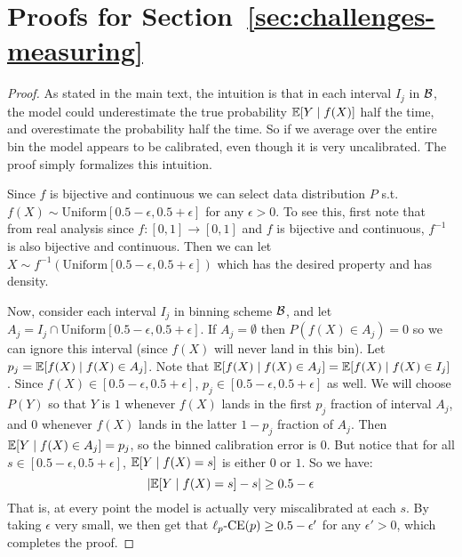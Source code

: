\newpage
\section{Proofs for Section~\ref{sec:challenges-measuring}}
\label{sec:appendix-platt-not-calibrated}



\continuousNotCalibrated*

\begin{proof}
As stated in the main text, the intuition is that in each interval $I_j$ in $\mathcal{B}{}$, the model could underestimate the true probability $\mathbb{E}[Y \mid f(X)]$ half the time, and overestimate the probability half the time. So if we average over the entire bin the model appears to be calibrated, even though it is very uncalibrated. The proof simply formalizes this intuition.

Since $f$ is bijective and continuous we can select data distribution $P$ s.t. $f(X) \sim \mbox{Uniform}[0.5 - \epsilon, 0.5 + \epsilon]$ for any $\epsilon > 0$. To see this, first note that from real analysis since $f : [0, 1] \to [0, 1]$ and $f$ is bijective and continuous, $f^{-1}$ is also bijective and continuous.
Then we can let $X \sim f^{-1}(\mbox{Uniform}[0.5 - \epsilon, 0.5 + \epsilon])$ which has the desired property and has density.

Now, consider each interval $I_j$ in binning scheme $\mathcal{B}{}$, and let $A_j = I_j \cap \mbox{Uniform}[0.5 - \epsilon, 0.5 + \epsilon]$.
If $A_j = \emptyset$ then $P(f(X) \in A_j) = 0$ so we can ignore this interval (since $f(X)$ will never land in this bin).
Let $p_j = \mathbb{E}[f(X) \mid f(X) \in A_j]$.
Note that $\mathbb{E}[f(X) \mid f(X) \in A_j] = \mathbb{E}[f(X) \mid f(X) \in I_j]$.
Since $f(X) \in [0.5 - \epsilon, 0.5 + \epsilon]$, $p_j \in [0.5 - \epsilon, 0.5 + \epsilon]$ as well.
We will choose $P(Y)$ so that $Y$ is $1$ whenever $f(X)$ lands in the first $p_j$ fraction of interval $A_j$, and $0$ whenever $f(X)$ lands in the latter $1 - p_j$ fraction of $A_j$.
Then $\mathbb{E}[Y \mid f(X) \in A_j] = p_j$, so the binned calibration error is 0.
But notice that for all $s \in [0.5 - \epsilon, 0.5 + \epsilon]$, $\mathbb{E}[Y \mid f(X) = s]$ is either $0$ or $1$.
So we have:
\[ \lvert \mathbb{E}[Y \mid f(X) = s] - s \rvert \geq 0.5 - \epsilon \]
That is, at every point the model is actually very miscalibrated at each $s$. By taking $\epsilon$ very small, we then get that $\ell_p\mbox{-CE}(p) \geq 0.5 - \epsilon'$ for any $\epsilon' > 0$, which completes the proof.
\end{proof}


